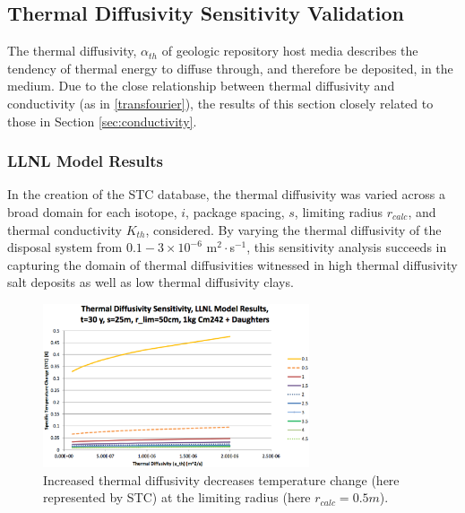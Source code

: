 \subsection{Thermal Diffusivity Sensitivity Validation}\label{sec:diffusivity}
The thermal diffusivity, $\alpha_{th}$ of geologic repository host media 
describes the tendency of thermal energy to diffuse through, and therefore be 
deposited, in the medium. Due to the close relationship between thermal 
diffusivity and conductivity (as in \eqref{transfourier}), the results of this section 
closely related to those in Section \ref{sec:conductivity}.

\FloatBarrier
\subsubsection{LLNL Model Results}

In the creation of the \gls{STC} database, the thermal diffusivity was varied 
across a broad domain for each isotope, $i$, package spacing, $s$, limiting 
radius $r_{calc}$, and thermal conductivity $K_{th}$, considered.  By 
varying the thermal diffusivity of the disposal system from $0.1-3\times 
10^{-6}$ m$^2\cdot$s$^{-1}$, this sensitivity analysis succeeds in capturing the domain of 
thermal diffusivities witnessed in high thermal diffusivity salt deposits as 
well as low thermal diffusivity clays.

\begin{figure}[htbp!]
  \begin{center}
    \includegraphics[width=0.7\textwidth]{./chapters/demonstration/diffusivity/diffusivity.eps}
  \end{center}
  \caption[$K_{th}$ Sensitivity to $\alpha_{th}$]{Increased thermal 
    diffusivity decreases temperature change (here represented by STC) at the 
    limiting radius (here $r_{calc} = 0.5m$).}
    \label{fig:Cm242alpha_kth_low}
  \end{figure}



